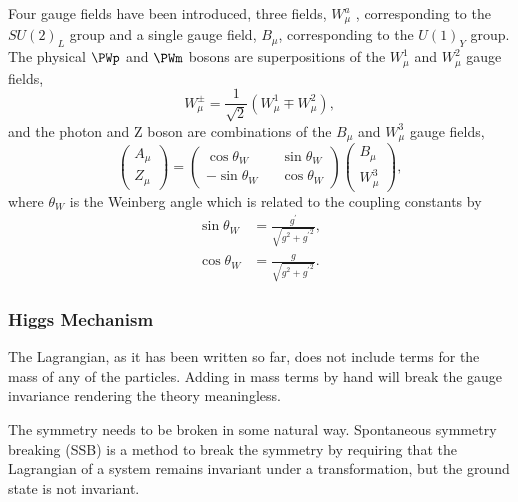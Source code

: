 Four gauge fields have been introduced, 
three fields, ${W}^{a}_{\mu}$ , corresponding to the $SU(2)_{L}$
group and a single gauge field, $B_{\mu}$, corresponding to the $U(1)_{Y}$ group.
The physical $\PWp$ and $\PWm$ bosons are superpositions of the $W^{1}_{\mu}$
and $W^{2}_{\mu}$ gauge fields,
\begin{equation}
W^{\pm}_{\mu} = \frac{1}{\sqrt{2}} \left(W^{1}_{\mu} \mp W^{2}_{\mu}\right),
\label{eq:wgauge}
\end{equation}
and the photon and Z boson are combinations of the $B_{\mu}$ and $W^{3}_{\mu}$
gauge fields,
\begin{equation}
\left( \begin{matrix} A_{\mu}\\ Z_{\mu}\end{matrix}\right) =
\left( \begin{matrix} \cos\theta_{W} && \sin\theta_{W} \\  
                      -\sin\theta_{W} && \cos\theta_{W} \end{matrix}\right) 
\left( \begin{matrix} B_{\mu}\\ W^{3}_{\mu}\end{matrix}\right) ,
\label{eq:bgauge}
\end{equation}
where $\theta_{W}$ is the Weinberg angle which is related to the coupling
constants by
\begin{align*}
\sin\theta_{W} &= \frac{g^{\prime}}{\sqrt{g^{2}+{g^{\prime}}^{2}}},\\
\cos\theta_{W} &= \frac{g}{\sqrt{g^{2}+{g^{\prime}}^{2}}}.
\end{align*}

\subsubsection{Higgs Mechanism}

The Lagrangian, as it has been written so far, does not include terms for the
mass of any of the particles.  Adding in mass terms by hand will break the gauge
invariance rendering the theory meaningless.  

The symmetry needs to be broken in some natural way.  Spontaneous symmetry
breaking (SSB) is a method to break the symmetry by requiring that the Lagrangian of a
system remains invariant under a transformation, but the ground state is not
invariant.


